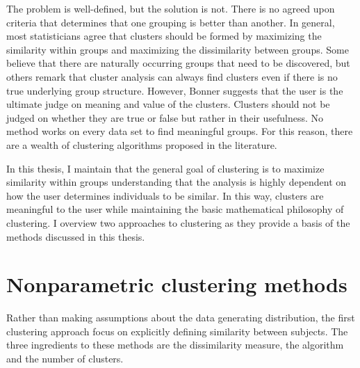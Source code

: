 The problem is well-defined, but the solution is not. There is no agreed upon criteria that determines that one grouping is better than another. In general, most statisticians agree that clusters should be formed by maximizing the similarity within groups and maximizing the dissimilarity between groups. Some believe that there are naturally occurring groups that need to be discovered, but others remark that cluster analysis can always find clusters even if there is no true underlying group structure. However, Bonner \cite{bonner1964} suggests that the user is the ultimate judge on meaning and value of the clusters. Clusters should not be judged on whether they are true or false but rather in their usefulness. No method works on every data set to find meaningful groups. For this reason, there are a wealth of clustering algorithms proposed in the literature. 

In this thesis, I maintain that the general goal of clustering is to maximize similarity within groups understanding that the analysis is highly dependent on how the user determines individuals to be similar. In this way, clusters are meaningful to the user while maintaining the basic mathematical philosophy of clustering.  I overview two approaches to clustering as they provide a basis of the methods discussed in this thesis. 

\section{Nonparametric clustering methods}
Rather than making assumptions about the data generating distribution, the first clustering approach focus on explicitly defining similarity between subjects. The three ingredients to these methods are the dissimilarity measure, the algorithm and the number of clusters.

